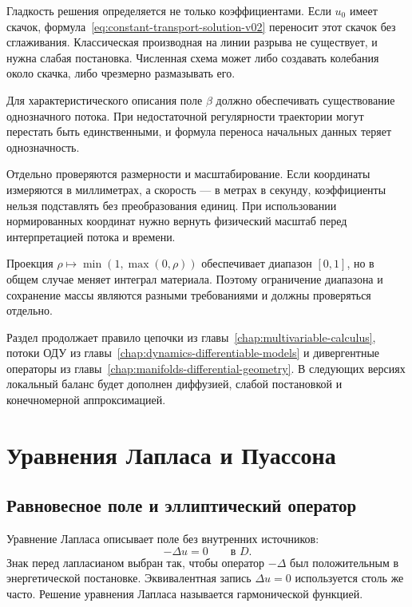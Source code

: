 Гладкость решения определяется не только коэффициентами. Если $u_0$ имеет скачок, формула~\eqref{eq:constant-transport-solution-v02} переносит этот скачок без сглаживания. Классическая производная на линии разрыва не существует, и нужна слабая постановка. Численная схема может либо создавать колебания около скачка, либо чрезмерно размазывать его.

Для характеристического описания поле $\beta$ должно обеспечивать существование однозначного потока. При недостаточной регулярности траектории могут перестать быть единственными, и формула переноса начальных данных теряет однозначность.

Отдельно проверяются размерности и масштабирование. Если координаты измеряются в миллиметрах, а скорость --- в метрах в секунду, коэффициенты нельзя подставлять без преобразования единиц. При использовании нормированных координат нужно вернуть физический масштаб перед интерпретацией потока и времени.

Проекция $\rho\mapsto\min(1,\max(0,\rho))$ обеспечивает диапазон $[0,1]$, но в общем случае меняет интеграл материала. Поэтому ограничение диапазона и сохранение массы являются разными требованиями и должны проверяться отдельно.

Раздел продолжает правило цепочки из главы~\ref{chap:multivariable-calculus}, потоки ОДУ из главы~\ref{chap:dynamics-differentiable-models} и дивергентные операторы из главы~\ref{chap:manifolds-differential-geometry}. В следующих версиях локальный баланс будет дополнен диффузией, слабой постановкой и конечномерной аппроксимацией.

\section{Уравнения Лапласа и Пуассона}
\label{sec:laplace-poisson-equations}

\subsection{Равновесное поле и эллиптический оператор}

Уравнение Лапласа описывает поле без внутренних источников:
\begin{equation}
\label{eq:laplace-equation-v03}
-\Delta u=0
\qquad
\text{в }D.
\end{equation}
Знак перед лапласианом выбран так, чтобы оператор $-\Delta$ был положительным в энергетической постановке. Эквивалентная запись $\Delta u=0$ используется столь же часто. Решение уравнения Лапласа называется гармонической функцией.

